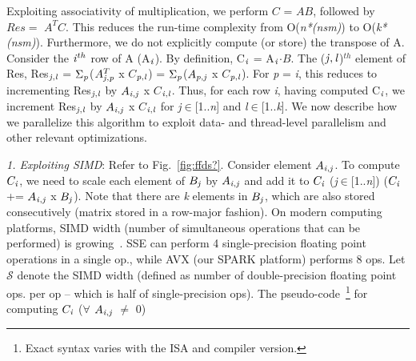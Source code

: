     Exploiting associativity of multiplication, we perform $C$ = $AB$, 
    followed by $Res =$ $A^TC$. This reduces the run-time complexity from
    O({\it{n*(nsm)}}) to O({\it{k*(nsm)}}). Furthermore, we do not
    explicitly compute (or store) the transpose of A.  Consider the
    ${\it{i}}^{th}$ row of A (A$_{\it{i}}$). 
    By definition, 
    C$_{\it{i}}$ %
    = A$_{\it{i}}$$\cdot$$B$.
     The (${\it{j}},{\it{l}}$)$^{th}$ element of Res,
    Res$_{{\it{j}},{\it{l}}}$ =
    $\Sigma_{\it{p}}$($A^T_{{\it{j}},{\it{p}}}$ x $C$$_{{\it{p}},{\it{l}}}$) = 
    $\Sigma_{\it{p}}$($A_{{\it{p}},{\it{j}}}$ x
    $C$$_{{\it{p}},{\it{l}}}$).
    For {\it{p}} = {\it{i}}, this reduces to incrementing
    Res$_{{\it{j}},{\it{l}}}$ by $A_{{\it{i}},{\it{j}}}$ x
    $C$$_{{\it{i}},{\it{l}}}$. 
    Thus, for each row {\it{i}}, 
    having computed C$_{\it{i}}$, we
    increment Res$_{{\it{j}},{\it{l}}}$ 
    by $A_{{\it{i}},{\it{j}}}$ x $C$$_{{\it{i}},{\it{l}}}$
    for {\it{j}}$\in$[1..{\it{n}}] and {\it{l}}$\in$[1..{\it{k}}].
     We now describe how we parallelize this algorithm to exploit
     data- and thread-level parallelism and other relevant
     optimizations.

     \vspace*{0.1in}
     {\it{1. Exploiting SIMD}}: Refer to Fig.~\ref{fig:ffds?}. 
     Consider element $A_{{\it{i}},{\it{j}}}$. To compute
     $C_{\it{i}}$, we need to scale each element of
     $B_{{\it{j}}}$ by  $A_{{\it{i}},{\it{j}}}$ and add it to
     $C_{\it{i}}$ ({\it{j}}$\in$[1..{\it{n}}]) ($C_{\it{i}}$ +=
     $A_{{\it{i}},{\it{j}}}$ x $B_{{\it{j}}}$). Note that there are
     {\it{k}} elements in $B_{{\it{j}}}$, which are also stored
     consecutively (matrix stored in a row-major fashion).
     On modern computing platforms, SIMD width (number of simultaneous
     operations that can be performed) is
     growing~\cite{intel1,intel2}. SSE can perform 4
     single-precision floating point operations in a single op., while
     AVX (our SPARK platform) performs 8 ops. Let $\mathcal{S}$ denote the SIMD width
     (defined as number of double-precision floating point ops. per op
     -- which is half of single-precision ops).
     The pseudo-code~\footnote{Exact syntax varies with the ISA and
     compiler version.} for computing $C_{\it{i}}$ ($\forall$ $A_{{\it{i}},{\it{j}}}$ $\neq$ 0)
     \vspace*{0.05in}

